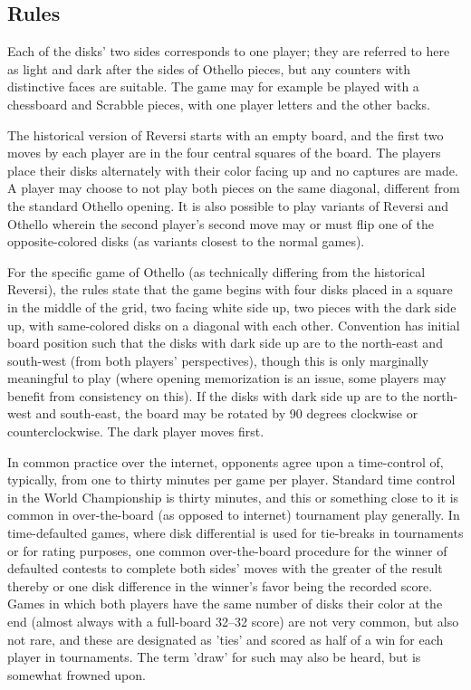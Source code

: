 \documentclass[a4paper]{report}
\begin{document}
\subsection{Rules}
Each of the disks' two sides corresponds to one player; they are referred to here as light and dark after the sides of Othello pieces, but any counters with distinctive faces are suitable. The game may for example be played with a chessboard and Scrabble pieces, with one player letters and the other backs. 
\par
The historical version of Reversi starts with an empty board, and the first two moves by each player are in the four central squares of the board. The players place their disks alternately with their color facing up and no captures are made. A player may choose to not play both pieces on the same diagonal, different from the standard Othello opening. It is also possible to play variants of Reversi and Othello wherein the second player's second move may or must flip one of the opposite-colored disks (as variants closest to the normal games). 
\par
For the specific game of Othello (as technically differing from the historical Reversi), the rules state that the game begins with four disks placed in a square in the middle of the grid, two facing white side up, two pieces with the dark side up, with same-colored disks on a diagonal with each other. Convention has initial board position such that the disks with dark side up are to the north-east and south-west (from both players' perspectives), though this is only marginally meaningful to play (where opening memorization is an issue, some players may benefit from consistency on this). If the disks with dark side up are to the north-west and south-east, the board may be rotated by 90 degrees clockwise or counterclockwise. The dark player moves first. 
\par
In common practice over the internet, opponents agree upon a time-control of, typically, from one to thirty minutes per game per player. Standard time control in the World Championship is thirty minutes, and this or something close to it is common in over-the-board (as opposed to internet) tournament play generally. In time-defaulted games, where disk differential is used for tie-breaks in tournaments or for rating purposes, one common over-the-board procedure for the winner of defaulted contests to complete both sides' moves with the greater of the result thereby or one disk difference in the winner's favor being the recorded score. Games in which both players have the same number of disks their color at the end (almost always with a full-board 32–32 score) are not very common, but also not rare, and these are designated as 'ties' and scored as half of a win for each player in tournaments. The term 'draw' for such may also be heard, but is somewhat frowned upon. 
\end{document}
